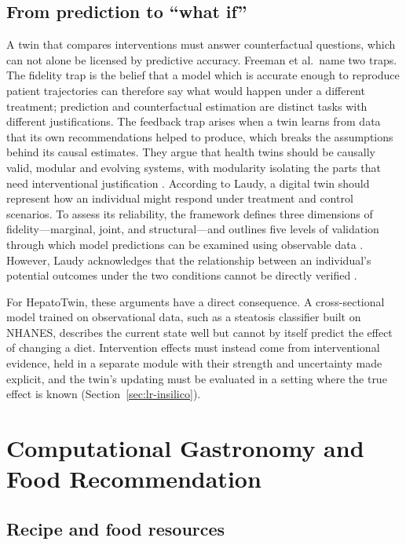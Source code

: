 \subsection{From prediction to ``what if''}

A twin that compares interventions must answer counterfactual questions, which can not alone be licensed by predictive accuracy. Freeman et al.\ name two traps. The fidelity trap is the belief that a model which is accurate enough to reproduce patient trajectories can therefore say what would happen under a different treatment; prediction and counterfactual estimation are distinct tasks with different justifications. The feedback trap arises when a twin learns from data that its own recommendations helped to produce, which breaks the assumptions behind its causal estimates. They argue that health twins should be causally valid, modular and evolving systems, with modularity isolating the parts that need interventional justification \cite{freeman2026traps}. According to Laudy, a digital twin should represent how an individual might respond under treatment and control scenarios. To assess its reliability, the framework defines three dimensions of fidelity---marginal, joint, and structural---and outlines five levels of validation through which model predictions can be examined using observable data \cite{laudy2026counterfactual}. However, Laudy acknowledges that the relationship between an individual's potential outcomes under the two conditions cannot be directly verified \cite{laudy2026counterfactual}.

For HepatoTwin, these arguments have a direct consequence. A cross-sectional model trained on observational data, such as a steatosis classifier built on NHANES, describes the current state well but cannot by itself predict the effect of changing a diet. Intervention effects must instead come from interventional evidence, held in a separate module with their strength and uncertainty made explicit, and the twin's updating must be evaluated in a setting where the true effect is known (Section~\ref{sec:lr-insilico}).

\section{Computational Gastronomy and Food Recommendation}
\label{sec:lr-gastro}

\subsection{Recipe and food resources}

